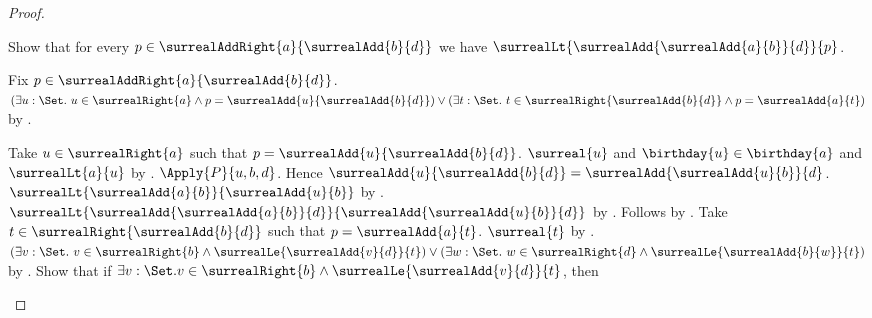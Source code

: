 \begin{proof}
\begin{subproof}
\begin{subproof}
        \end{subproof}
        Show that for every
            $p\in\surrealAddRight{a}{\surrealAdd{b}{d}}$ we have
            $\surrealLt{\surrealAdd{\surrealAdd{a}{b}}{d}}{p}$.
        \begin{subproof}
            Fix $p\in\surrealAddRight{a}{\surrealAdd{b}{d}}$.
            $(\exists u:\Set.\ u\in\surrealRight{a}\land
                    p=\surrealAdd{u}{\surrealAdd{b}{d}})
                \lor
                (\exists t:\Set.\ t\in\surrealRight{\surrealAdd{b}{d}}\land
                    p=\surrealAdd{a}{t})$
                by .
            \begin{byCase}
                    Take $u\in\surrealRight{a}$ such that
                        $p=\surrealAdd{u}{\surrealAdd{b}{d}}$.
                    $\surreal{u}$ and $\birthday{u}\in\birthday{a}$ and
                        $\surrealLt{a}{u}$
                        by .
                    $\Apply{P}{u,b,d}$.
                    Hence $\surrealAdd{u}{\surrealAdd{b}{d}}=
                        \surrealAdd{\surrealAdd{u}{b}}{d}$.
                    $\surrealLt{\surrealAdd{a}{b}}
                        {\surrealAdd{u}{b}}$
                        by .
                    $\surrealLt{\surrealAdd{\surrealAdd{a}{b}}{d}}
                        {\surrealAdd{\surrealAdd{u}{b}}{d}}$
                        by .
                    Follows by \auto.
                    Take $t\in\surrealRight{\surrealAdd{b}{d}}$ such that
                        $p=\surrealAdd{a}{t}$.
                    $\surreal{t}$ by
                        .
                    $(\exists v:\Set.\ v\in\surrealRight{b}\land
                            \surrealLe{\surrealAdd{v}{d}}{t})
                        \lor
                        (\exists w:\Set.\ w\in\surrealRight{d}\land
                            \surrealLe{\surrealAdd{b}{w}}{t})$
                        by .
                    Show that if $\exists v:\Set.
                            v\in\surrealRight{b}\land
                            \surrealLe{\surrealAdd{v}{d}}{t}$, then

\end{byCase}
\end{subproof}
\end{subproof}
\end{proof}
